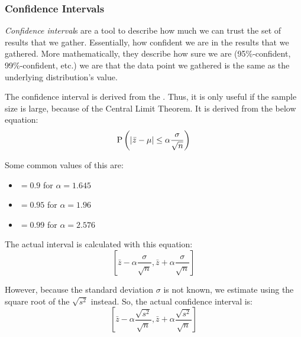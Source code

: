 \subsubsection{Confidence Intervals}\label{subsubsec:Confidence_Intervals}
\begin{definition}\label{def:Confidence_Interval}
  \emph{Confidence interval}s are a tool to describe how much we can trust the set of results that we gather.
  Essentially, how confident we are in the results that we gathered.
  More mathematically, they describe how sure we are (95\%-confident, 99\%-confident, etc.) we are that the data point we gathered is the same as the underlying distribution's value.

  The confidence interval is derived from the .
  Thus, it is only useful if the sample size is large, because of the Central Limit Theorem.
  It is derived from the below equation:
  \begin{equation}\label{eq:Confidence_Interval_Entire}
    \operatorname{\operatorname{P}} \left( \lvert \bar{z} - \mu \rvert \leq \alpha \frac{\sigma}{\sqrt{n}} \right)
  \end{equation}

  Some common values of this are:
  \begin{itemize}[noitemsep]
  \item $= 0.9$ for $\alpha = 1.645$
  \item $= 0.95$ for $\alpha = 1.96$
  \item $= 0.99$ for $\alpha = 2.576$
  \end{itemize}

  The actual interval is calculated with this equation:
  \begin{equation}\label{eq:Confidence_Interval_Sigma}
    \left[ \bar{z} - \alpha \frac{\sigma}{\sqrt{n}}, \bar{z} + \alpha \frac{\sigma}{\sqrt{n}} \right]
  \end{equation}

  However, because the standard deviation $\sigma$ is not known, we estimate using the square root of the  $\sqrt{s^{2}}$ instead.
  So, the actual confidence interval is:
  \begin{equation}\label{eq:Confidence_Interval_Sqrt_S}
    \left[ \bar{z} - \alpha \frac{\sqrt{s^{2}}}{\sqrt{n}}, \bar{z} + \alpha \frac{\sqrt{s^{2}}}{\sqrt{n}} \right]
  \end{equation}


\end{definition}
